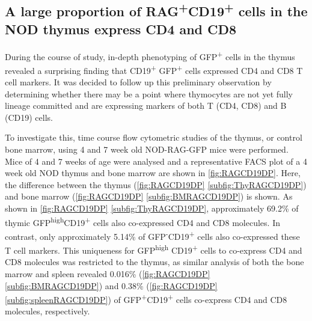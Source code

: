 \subsection{A large proportion of RAG\textsuperscript{+}CD19\textsuperscript{+} cells in the NOD thymus express CD4 and CD8}

During the course of study, in-depth phenotyping of GFP\textsuperscript{+} cells in the thymus revealed a surprising finding that CD19\textsuperscript{+} GFP\textsuperscript{+} cells expressed CD4 and CD8 T cell markers.
It was decided to follow up this preliminary observation by determining whether there may be a point where thymocytes are not yet fully lineage committed and are expressing markers of both T (CD4, CD8) and B (CD19) cells.

To investigate this, time course flow cytometric studies of the thymus, or control bone marrow, using 4 and 7 week old NOD-RAG-GFP mice were performed.
Mice of 4 and 7 weeks of age were analysed and a representative FACS plot of a 4 week old NOD thymus and bone marrow are shown in \cref{fig:RAGCD19DP}. 
Here, the difference between the thymus (\cref{fig:RAGCD19DP} \ref{subfig:ThyRAGCD19DP}) and bone marrow (\cref{fig:RAGCD19DP} \ref{subfig:BMRAGCD19DP}) is shown.
As shown in \cref{fig:RAGCD19DP} \ref{subfig:ThyRAGCD19DP}, approximately 69.2\% of thymic GFP\textsuperscript{high}CD19\textsuperscript{+} cells also co-expressed CD4 and CD8 molecules.
In contrast, only approximately 5.14\% of GFP\textsuperscript{-}CD19\textsuperscript{+} cells also co-expressed these T cell markers.
This uniqueness for GFP\textsuperscript{high} CD19\textsuperscript{+} cells to co-express CD4 and CD8 molecules was restricted to the thymus, as similar analysis of both the bone marrow and spleen revealed 0.016\% (\cref{fig:RAGCD19DP} \ref{subfig:BMRAGCD19DP}) and 0.38\% (\cref{fig:RAGCD19DP} \ref{subfig:spleenRAGCD19DP}) of GFP\textsuperscript{+}CD19\textsuperscript{+} cells co-express CD4 and CD8 molecules, respectively.



